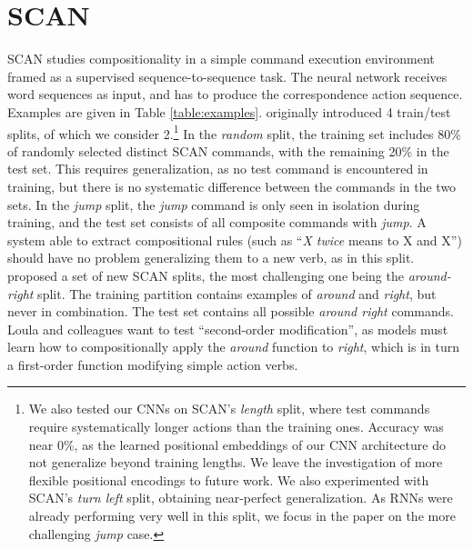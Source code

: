 \section{SCAN}
\label{sec:setup}

SCAN studies compositionality in a simple command
execution environment framed as a supervised sequence-to-sequence
task. The neural network receives word sequences as input, and has to
produce the correspondence action sequence. Examples are
given in Table \ref{table:examples}.
   originally introduced 4
train/test splits, of which we consider 2.\footnote{We also
  tested our CNNs on SCAN's \emph{length} split, where test commands
  require systematically longer actions than the training
  ones. Accuracy was near 0\%, as the learned positional
  embeddings of our CNN architecture do not 
  generalize beyond  training lengths. We leave the
  investigation of more flexible positional encodings \cite[as in,
  e.g.,][]{vaswani:etal:2017} to future work. We also experimented
  with SCAN's \emph{turn left} split, obtaining near-perfect
  generalization. As RNNs were already performing very well in this split,
  we focus in the paper on the more challenging
  \emph{jump} case.} In the \emph{random} split, the training set
includes 80\% of randomly selected distinct SCAN commands, with the
remaining 20\% in the test set. This requires generalization,
as no test command is encountered in training, but there is no
systematic difference between the commands in the two sets.  In the
\emph{jump} split, the \emph{jump} command is only seen in isolation
during training, and the test set consists of all composite commands
with \emph{jump}. A system able to extract compositional rules (such
as ``\emph{X twice} means to X and X'') should have no problem
generalizing them to a new verb, as in this
split.  proposed a set of new SCAN splits,
the most challenging one being the \emph{around-right}
split.  The training partition contains examples of \emph{around} and
\emph{right}, but never in combination. The test set
contains all possible \emph{around right} commands. Loula and
colleagues want to test ``second-order modification'', as models
must learn how to compositionally apply the \emph{around}
function to \emph{right}, which is in turn a first-order function
modifying simple action verbs.


